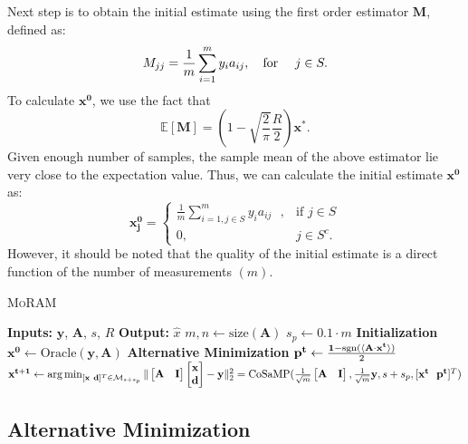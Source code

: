 Next step is to obtain the initial estimate using the first order estimator $\mathbf{M}$, defined as:
$$
M_{jj} = \frac{1}{m}\sum_{i=1}^{m}y_{i}a_{ij},~~~\textnormal{for}~~~~j \in S.
$$
To calculate $\mathbf{{x}^0}$, we use the fact that
$$
\mathbb{E}[\mathbf{M}] = \left( 1 - \sqrt{\frac{2}{\pi}}\frac{R}{2} \right) \mathbf{{x}^*}.
$$
Given enough number of samples, the sample mean of the above estimator lie very close to the expectation value. Thus, we can calculate the initial estimate $\mathbf{{x}^0}$ as:
\begin{equation}
	\mathbf{{x}^0_j} = 
	\begin{cases}
	\frac{1}{m}\sum_{i=1, j \in S}^{m}y_{i}a_{ij}~~~,& \text{if } j \in S\\
	0,              & j \in S^c.
	\end{cases}
	\label{eq:init}
\end{equation}
However, it should be noted that the quality of the initial estimate is a direct function of the number of measurements $(m)$. 


\begin{algorithm}[H]
	\caption{\textsc{MoRAM}}
	\label{alg:DMF}
	\begin{algorithmic}
		\State\textbf{Inputs:} $\mathbf{y}$, $\mathbf{A}$, $s$, $R$
		\State\textbf{Output:}  $\widehat{x}$
		\State $m,n \leftarrow \mathrm{size}(\mathbf{A})$ 
		\State $s_p \leftarrow 0.1\cdot m$
		\State \textbf{Initialization}
		\State $\mathbf{x^0} \leftarrow \textrm{Oracle}(\mathbf{y, A})$ 
		\State \textbf{Alternative Minimization}
		\State $\mathbf{{p}^{t}} \leftarrow \frac{\mathbf{1}-\mathrm{sgn}(\langle \mathbf{A} \cdot \mathbf{x^t} \rangle)}{2}$
		\State $\mathbf{{x}^{t+1}}\leftarrow \operatorname*{arg\,min}_{[\mathbf{x~d}]^T \in \mathcal{M}_{s+s_p}}\|\begin{bmatrix} \mathbf{A} & \mathbf{I} \end{bmatrix} \begin{bmatrix} \mathbf{x} \\ \mathbf{d} \end{bmatrix} - \mathbf{y}\|_2^2 = \mathrm{CoSaMP}(\frac{1}{\sqrt{m}}\begin{bmatrix} \mathbf{A} & \mathbf{I} \end{bmatrix},\frac{1}{\sqrt{m}}\mathbf{y},s+s_p,[\mathbf{x^t~~p^t}]^T)$
		\EndFor
	\end{algorithmic}
\end{algorithm}

\subsection{Alternative Minimization}
\label{sec:altmin}

